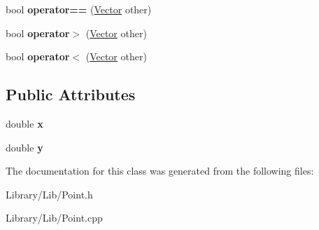 \begin{DoxyCompactItemize}
\item 
\hypertarget{classty_lib_1_1_vector_aa8a02599b80c05ec90b2aa6403c5e3b3}{}bool {\bfseries operator==} (\hyperlink{classty_lib_1_1_vector}{Vector} other)\label{classty_lib_1_1_vector_aa8a02599b80c05ec90b2aa6403c5e3b3}

\item 
\hypertarget{classty_lib_1_1_vector_a3b951ce00538476f129e33bea9145608}{}bool {\bfseries operator$>$} (\hyperlink{classty_lib_1_1_vector}{Vector} other)\label{classty_lib_1_1_vector_a3b951ce00538476f129e33bea9145608}

\item 
\hypertarget{classty_lib_1_1_vector_a20de56626f5d5098d96f9fc0dea183ff}{}bool {\bfseries operator$<$} (\hyperlink{classty_lib_1_1_vector}{Vector} other)\label{classty_lib_1_1_vector_a20de56626f5d5098d96f9fc0dea183ff}

\end{DoxyCompactItemize}
\subsection*{Public Attributes}
\begin{DoxyCompactItemize}
\item 
\hypertarget{classty_lib_1_1_vector_a41a283ec7538e3b16b213e0c8b3699af}{}double {\bfseries x}\label{classty_lib_1_1_vector_a41a283ec7538e3b16b213e0c8b3699af}

\item 
\hypertarget{classty_lib_1_1_vector_ad1bc5f5bf2a081ae2b69585976a842dd}{}double {\bfseries y}\label{classty_lib_1_1_vector_ad1bc5f5bf2a081ae2b69585976a842dd}

\end{DoxyCompactItemize}


The documentation for this class was generated from the following files\+:\begin{DoxyCompactItemize}
\item 
Library/\+Lib/Point.\+h\item 
Library/\+Lib/Point.\+cpp\end{DoxyCompactItemize}
